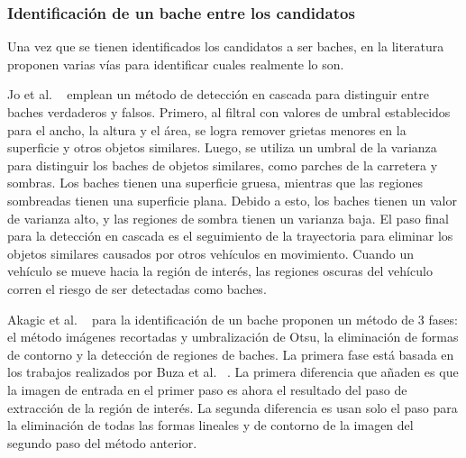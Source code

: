 		\subsubsection{Identificación de un bache entre los candidatos}
		Una vez que se tienen identificados los candidatos a ser baches, en la literatura proponen varias vías para  
		identificar cuales realmente lo son.

		Jo et al. ~ emplean un método de detección en cascada para distinguir
		entre baches verdaderos y falsos. Primero, al filtral con valores de umbral establecidos para el ancho, la
		altura y el área, se logra remover grietas menores en la superficie y otros objetos similares. Luego, 
		se utiliza un umbral de la varianza para distinguir los baches de objetos similares, como parches de 
		la carretera y sombras. Los baches tienen una superficie gruesa, mientras que las regiones sombreadas 
		tienen una superficie plana. Debido a esto, los baches tienen un valor de varianza alto, y las regiones 
		de sombra tienen un varianza baja. El paso final para la detección en cascada es el seguimiento de 
		la trayectoria para eliminar los objetos similares causados por otros vehículos en movimiento. 
		Cuando un vehículo se mueve hacia la región de interés, las regiones oscuras del vehículo
		corren el riesgo de ser detectadas como baches.

		Akagic et al. ~ para la identificación de un bache proponen un método de 3 fases:
		el método imágenes recortadas y umbralización de Otsu, la eliminación de formas de contorno y la detección 
		de regiones de baches. La primera fase está basada en los trabajos realizados por  Buza et al. ~.
		La primera diferencia que añaden es que la imagen de entrada en el primer paso es ahora el resultado del paso de extracción 
		de la región de interés. La segunda diferencia es usan solo el paso para la eliminación de todas las formas lineales y de contorno de la imagen del
		segundo paso del método anterior.


